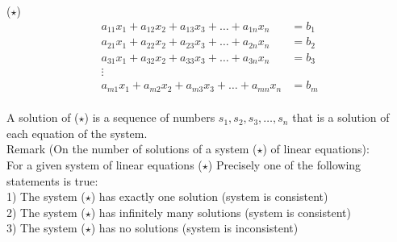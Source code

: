\documentclass{jhwhw}
\begin{document}
(\(\star\)) \begin{align*} 
a_{11} x_1 + a_{12} x_2 + a_{13} x_3 + \ldots + a_{1n} x_n &= b_1\\
a_{21} x_1 + a_{22} x_2 + a_{23} x_3 + \ldots + a_{2n} x_n &= b_2\\
a_{31} x_1 + a_{32} x_2 + a_{33} x_3 + \ldots + a_{3n} x_n &= b_3\\
\vdots\\
a_{m1} x_1 + a_{m2} x_2 + a_{m3} x_3 + \ldots + a_{mn} x_n &= b_m
\end{align*}
\\

A solution of (\(\star\)) is a sequence of numbers \(s_1, s_2, s_3, \ldots, s_n\) that is a solution of each equation of the system.
\\

Remark (On the number of solutions of a system (\(\star\)) of linear equations):
\\

For a given system of linear equations (\(\star\)) Precisely one of the following statements is true:
\\

1) The system (\(\star\)) has exactly one solution (system is consistent) \\
2) The system (\(\star\)) has infinitely many solutions (system is consistent) \\
3) The system (\(\star\)) has no solutions (system is inconsistent) \\
\end{document}
